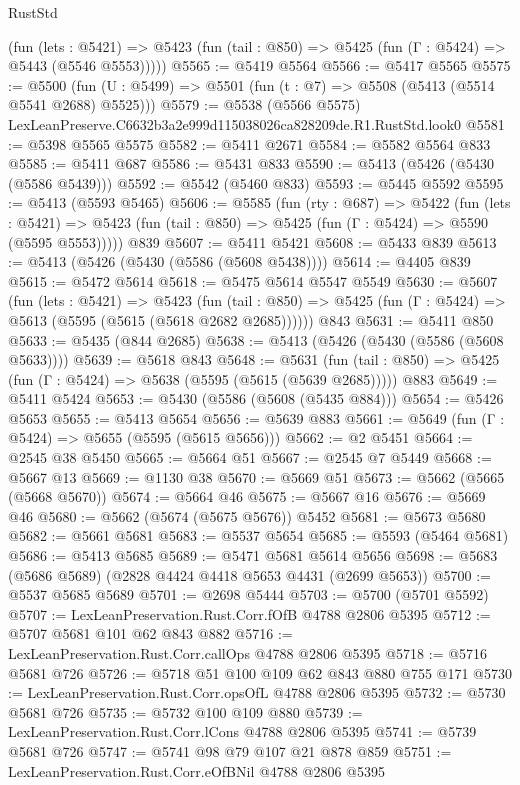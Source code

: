 \begin{lexlean}{RustStd}
\begin{coremodule}
      (fun (lets : @5421) =>
      @5423 (fun (tail : @850) => @5425 (fun (Γ : @5424) => @5443 (@5546 @5553)))))
@5565 := @5419 @5564
@5566 := @5417 @5565
@5575 := @5500 (fun (U : @5499) => @5501 (fun (t : @7) => @5508 (@5413 (@5514 @5541 @2688) @5525)))
@5579 := @5538 (@5566 @5575) LexLeanPreserve.C6632b3a2e999d115038026ca828209de.R1.RustStd.look0
@5581 := @5398 @5565 @5575
@5582 := @5411 @2671
@5584 := @5582 @5564 @833
@5585 := @5411 @687
@5586 := @5431 @833
@5590 := @5413 (@5426 (@5430 (@5586 @5439)))
@5592 := @5542 (@5460 @833)
@5593 := @5445 @5592
@5595 := @5413 (@5593 @5465)
@5606 := @5585
    (fun (rty : @687) =>
    @5422
      (fun (lets : @5421) =>
      @5423 (fun (tail : @850) => @5425 (fun (Γ : @5424) => @5590 (@5595 @5553)))))
    @839
@5607 := @5411 @5421
@5608 := @5433 @839
@5613 := @5413 (@5426 (@5430 (@5586 (@5608 @5438))))
@5614 := @4405 @839
@5615 := @5472 @5614
@5618 := @5475 @5614 @5547 @5549
@5630 := @5607
    (fun (lets : @5421) =>
    @5423
      (fun (tail : @850) => @5425 (fun (Γ : @5424) => @5613 (@5595 (@5615 (@5618 @2682 @2685))))))
    @843
@5631 := @5411 @850
@5633 := @5435 (@844 @2685)
@5638 := @5413 (@5426 (@5430 (@5586 (@5608 @5633))))
@5639 := @5618 @843
@5648 := @5631
    (fun (tail : @850) => @5425 (fun (Γ : @5424) => @5638 (@5595 (@5615 (@5639 @2685)))))
    @883
@5649 := @5411 @5424
@5653 := @5430 (@5586 (@5608 (@5435 @884)))
@5654 := @5426 @5653
@5655 := @5413 @5654
@5656 := @5639 @883
@5661 := @5649 (fun (Γ : @5424) => @5655 (@5595 (@5615 @5656)))
@5662 := @2 @5451
@5664 := @2545 @38 @5450
@5665 := @5664 @51
@5667 := @2545 @7 @5449
@5668 := @5667 @13
@5669 := @1130 @38
@5670 := @5669 @51
@5673 := @5662 (@5665 (@5668 @5670))
@5674 := @5664 @46
@5675 := @5667 @16
@5676 := @5669 @46
@5680 := @5662 (@5674 (@5675 @5676)) @5452
@5681 := @5673 @5680
@5682 := @5661 @5681
@5683 := @5537 @5654
@5685 := @5593 (@5464 @5681)
@5686 := @5413 @5685
@5689 := @5471 @5681 @5614 @5656
@5698 := @5683 (@5686 @5689) (@2828 @4424 @4418 @5653 @4431 (@2699 @5653))
@5700 := @5537 @5685 @5689
@5701 := @2698 @5444
@5703 := @5700 (@5701 @5592)
@5707 := LexLeanPreservation.Rust.Corr.fOfB @4788 @2806 @5395
@5712 := @5707 @5681 @101 @62 @843 @882
@5716 := LexLeanPreservation.Rust.Corr.callOps @4788 @2806 @5395
@5718 := @5716 @5681 @726
@5726 := @5718 @51 @100 @109 @62 @843 @880 @755 @171
@5730 := LexLeanPreservation.Rust.Corr.opsOfL @4788 @2806 @5395
@5732 := @5730 @5681 @726
@5735 := @5732 @100 @109 @880
@5739 := LexLeanPreservation.Rust.Corr.lCons @4788 @2806 @5395
@5741 := @5739 @5681 @726
@5747 := @5741 @98 @79 @107 @21 @878 @859
@5751 := LexLeanPreservation.Rust.Corr.eOfBNil @4788 @2806 @5395

\end{coremodule}
\end{lexlean}

